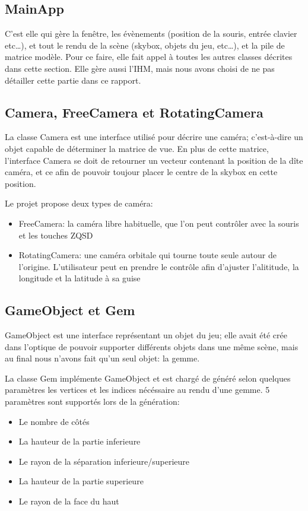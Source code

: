 \documentclass[a4paper,12pt]{article}
\begin{document}
\subsection{MainApp}
C'est elle qui gère la fenêtre, les évènements (position de la souris, entrée clavier etc\ldots), et tout le
rendu de la scène (skybox, objets du jeu, etc\ldots), et la pile de matrice modèle.
Pour ce faire, elle fait appel à toutes les autres classes décrites dans cette section. Elle gère aussi l'IHM,
mais nous avons choisi de ne pas détailler cette partie dans ce rapport.

\subsection{Camera, FreeCamera et RotatingCamera}
La classe Camera est une interface utilisé pour décrire une caméra; c'est-à-dire un objet capable de déterminer
la matrice de vue. En plus de cette matrice, l'interface Camera se doit de retourner un vecteur contenant la
position de la dîte caméra, et ce afin de pouvoir toujour placer le centre de la skybox en cette position.

Le projet propose deux types de caméra:
\begin{itemize}
    \item FreeCamera: la caméra libre habituelle, que l'on peut contrôler avec la souris et les touches ZQSD
    \item RotatingCamera: une caméra orbitale qui tourne toute seule autour de l'origine. L'utilisateur peut en prendre le contrôle afin d'ajuster l'alititude, la longitude et la latitude à sa guise
\end{itemize}

\subsection{GameObject et Gem}
GameObject est une interface représentant un objet du jeu; elle avait été crée dans l'optique de pouvoir supporter
différents objets dans une même scène, mais au final nous n'avons fait qu'un seul objet: la gemme.

La classe Gem implémente GameObject et est chargé de généré selon quelques paramètres les vertices et les indices
nécéssaire au rendu d'une gemme. 5 paramètres sont supportés lors de la génération:
\begin{itemize}
    \item Le nombre de côtés
    \item La hauteur de la partie inferieure
    \item Le rayon de la séparation inferieure/superieure
    \item La hauteur de la partie superieure
    \item Le rayon de la face du haut
\end{itemize}
\end{document}
